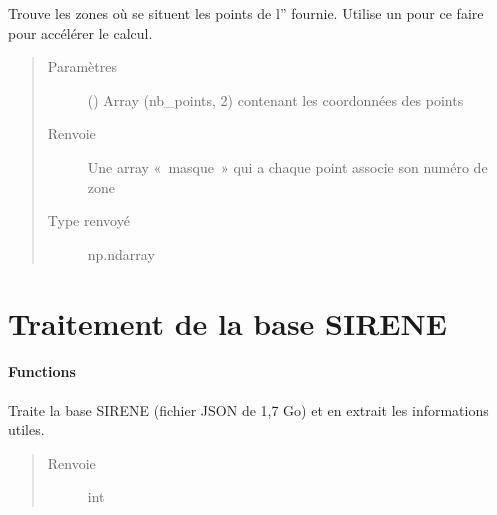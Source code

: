 \documentclass[letterpaper,10pt,french]{sphinxmanual}
\begin{document}
\begin{fulllineitems}
\label{\detokenize{index:src.clusterizer.utils.seine_data_utils.rapport_a_la_seine_spatial_index_point}}
\sphinxAtStartPar
Trouve les zones où se situent les points de l” fournie.
Utilise un  pour ce faire pour accélérer le calcul.
\begin{quote}\begin{description}
\item[{Paramètres}] \leavevmode
\sphinxAtStartPar
{} () \textendash{} Array (nb\_points, 2) contenant les coordonnées des points

\item[{Renvoie}] \leavevmode
\sphinxAtStartPar
Une array « masque » qui a chaque point associe son numéro de zone

\item[{Type renvoyé}] \leavevmode
\sphinxAtStartPar
np.ndarray

\end{description}\end{quote}

\end{fulllineitems}



\chapter{Traitement de la base SIRENE}
\label{\detokenize{index:traitement-de-la-base-sirene}}\subsubsection*{Functions}

\begin{fulllineitems}
\label{\detokenize{index:_CPPv44mainv}}%
\pysigstartmultiline
{}%
\pysigstopmultiline
\sphinxAtStartPar
Traite la base SIRENE (fichier JSON de 1,7 Go) et en extrait les informations utiles. 
\begin{quote}\begin{description}
\item[{Renvoie}] \leavevmode
\sphinxAtStartPar
int 

\end{description}\end{quote}

\end{fulllineitems}
\end{document}
